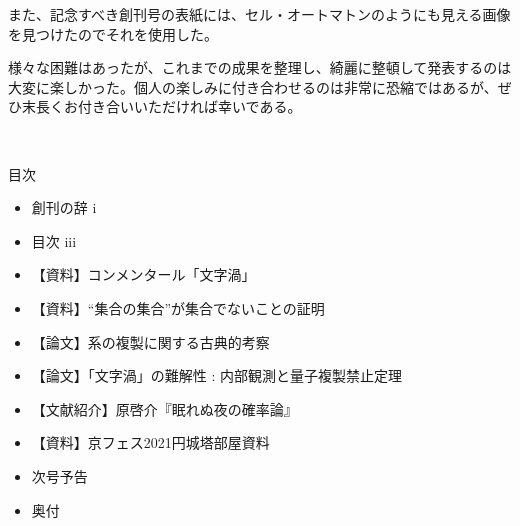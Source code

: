 \documentclass[10pt, a5paper, twoside]{jsarticle}
\theoremstyle{definition}
\begin{document}
	また、記念すべき創刊号の表紙には、セル・オートマトンのようにも見える画像を見つけたのでそれを使用した。

	様々な困難はあったが、これまでの成果を整理し、綺麗に整頓して発表するのは大変に楽しかった。個人の楽しみに付き合わせるのは非常に恐縮ではあるが、ぜひ末長くお付き合いいただければ幸いである。


	\clearpage

	\begin{center}

	{\Large 　}

		\Large{目次}

	\end{center}

	\begin{itemize}
		\item 創刊の辞 \dotfill i

			\vspace{3mm}

		\item 目次 \dotfill iii

			\vspace{3mm}

		\item 【資料】コンメンタール「文字渦」 

			\vspace{3mm}

		\item 【資料】“集合の集合”が集合でないことの証明 

			\vspace{3mm}

		\item 【論文】系の複製に関する古典的考察 

			\vspace{3mm}

		\item 【論文】「文字渦」の難解性 : 内部観測と量子複製禁止定理 

			\vspace{3mm}

		\item 【文献紹介】原啓介『眠れぬ夜の確率論』 

			\vspace{3mm}

		\item 【資料】京フェス2021円城塔部屋資料 

			\vspace{3mm}

		\item 次号予告 

			\vspace{3mm}

		\item 奥付 

	\end{itemize}
\end{document}
